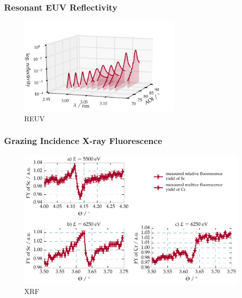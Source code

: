 \subsubsection{Resonant EUV Reflectivity}
\begin{figure}[htbp]
  \centering
  \includegraphics[width=0.7\textwidth]{img/CrSc_REUV_data}
  \caption{REUV}
  \label{ch_spec:fig_CrSc_REUV_data}
\end{figure}
\subsubsection{Grazing Incidence X-ray Fluorescence}
\begin{figure}[htbp]
  \centering
  \includegraphics[width=\textwidth]{img/CrSc_fluorescence_data}
  \caption{XRF}
  \label{ch_spec:fig_CrSc_fluorescence_data}
\end{figure}

